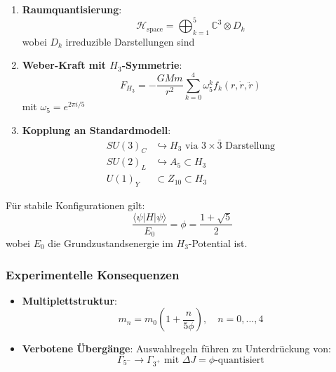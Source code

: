 \begin{enumerate}
    \item \textbf{Raumquantisierung}:
    \[
    \mathcal{H}_{\text{space}} = \bigoplus_{k=1}^{5} \mathbb{C}^3 \otimes D_k
    \]
    wobei $D_k$ irreduzible Darstellungen sind
    
    \item \textbf{Weber-Kraft mit $H_3$-Symmetrie}:
    \[
    F_{H_3} = -\frac{GMm}{r^2}\sum_{k=0}^{4}\omega_5^k f_k(r,\dot{r},\ddot{r})
    \]
    mit $\omega_5 = e^{2\pi i/5}$
    
    \item \textbf{Kopplung an Standardmodell}:
    \begin{align*}
    SU(3)_C &\hookrightarrow H_3 \text{ via } 3 \times \bar{3} \text{ Darstellung} \\
    SU(2)_L &\hookrightarrow A_5 \subset H_3 \\
    U(1)_Y &\subset Z_{10} \subset H_3
    \end{align*}
\end{enumerate}

\begin{theorem}
Für stabile Konfigurationen gilt:
\[
\frac{\langle \psi | H | \psi \rangle}{E_0} = \phi = \frac{1+\sqrt{5}}{2}
\]
wobei $E_0$ die Grundzustandsenergie im $H_3$-Potential ist.
\end{theorem}

\subsubsection{Experimentelle Konsequenzen}
\begin{itemize}
    \item \textbf{Multiplettstruktur}:
    \[
    m_n = m_0 \left(1 + \frac{n}{5\phi}\right), \quad n=0,...,4
    \]
    
    \item \textbf{Verbotene Übergänge}:
    Auswahlregeln führen zu Unterdrückung von:
    \[
    \Gamma_{5^-} \to \Gamma_{3^+} \text{ mit } \Delta J = \phi\text{-quantisiert}
    \]
\end{itemize}

